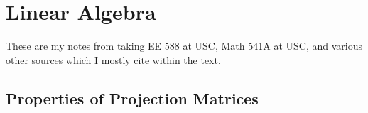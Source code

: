 %
%
%
%
%
%
%
%
%
%
%

\section{Linear Algebra}

These are my notes from taking EE 588 at USC, Math 541A at USC, and various other sources which I mostly cite within the text.

\subsection{Properties of Projection Matrices}

